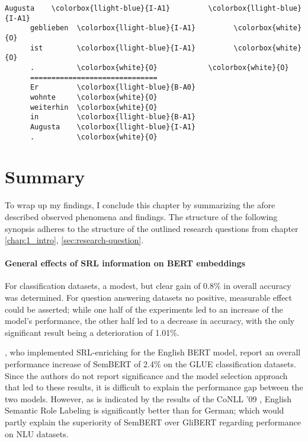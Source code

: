 {\begin{srl}[!h]
\begin{minipage}{0.45\linewidth}
\begin{BVerbatim}[commandchars=\\\{\}, fontsize=\footnotesize]
      Augusta    \colorbox{llight-blue}{I-A1}         \colorbox{llight-blue}{I-A1}
      geblieben  \colorbox{llight-blue}{I-A1}         \colorbox{white}{O}
      ist        \colorbox{llight-blue}{I-A1}         \colorbox{white}{O}
      .          \colorbox{white}{O}            \colorbox{white}{O}
      ==============================
      Er         \colorbox{llight-blue}{B-A0}
      wohnte     \colorbox{white}{O}
      weiterhin  \colorbox{white}{O}
      in         \colorbox{llight-blue}{B-A1}
      Augusta    \colorbox{llight-blue}{I-A1}
      .          \colorbox{white}{O}
    \end{BVerbatim}
  \end{minipage}
\end{srl}
\label{srl:ablation}
\endgroup


\newpage
\section{Summary}

To wrap up my findings, I conclude this chapter by summarizing the afore described observed
phenomena and findings. The structure of the following synopsis adheres to the structure of
the outlined research questions from chapter \ref{chap:1_intro}, \ref{sec:research-question}.


\paragraph*{General effects of SRL information on BERT embeddings}

For classification datasets, a modest, but clear gain of 0.8\% in overall accuracy was
determined. For question answering datasets
no positive, measurable effect could be asserted; while one half of the experiments led to
an increase of the model's performance, the other half led to a decrease in accuracy, with
the only significant result being a deterioration of 1.01\%.

\cite{zhang2019semantics}, who implemented SRL-enriching for the English BERT model, report an
overall performance increase of SemBERT of 2.4\% on the GLUE classification datasets. Since the
authors do not report significance and the model selection approach that led to these results,
it is difficult to explain the performance gap between the two models. However, as is indicated
by the results of the CoNLL '09 \citep{hajivc2009conll} , English Semantic Role Labeling is
significantly better than for German; which would partly explain the superiority of SemBERT over
GliBERT regarding performance on NLU datasets.

}
